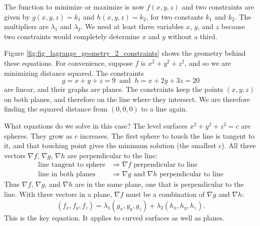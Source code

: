The function to minimize or maximize is now $f(x,y,z)$ and two constraints are given by $g(x,y,z) = k_1$ and $h(x,y,z) = k_2$, for two constants $k_1$ and $k_2$.  The multipliers are $\lambda_1$ and $\lambda_2$.  We need at least three variables $x$, $y$, and $z$ because two constraints would completely determine $x$ and $y$ without a third.

Figure \ref{fig:fig_lagrange_geometry_2_constraints} shows the geometry behind these equations.  For convenience, suppose $f$ is $x^2 + y^2 + z^2$, and so we are minimizing distance squared.  The constraints $$g = x + y + z = 9 \: \text{ and } \: h = x + 2y + 3z = 20$$ are linear, and their graphs are planes.  The constraints keep the points $(x,y,z)$ on both planes, and therefore on the line where they intersect.  We are therefore finding the squared distance from $(0,0,0)$ to a line again.  


What equations do we solve in this case?  The level surfaces $x^2 + y^2 + z^2 = c$ are spheres.  They grow as $c$ increases.  The first sphere to touch the line is tangent to it, and that touching point gives the minimum solution (the smallest $c$). All three vectors $\nabla f$, $\nabla g$, $\nabla h$ are perpendicular to the line:
\begin{align*}
\text{line tangent to sphere} & \Rightarrow \nabla f \text{ perpendicular to line} \\
\text{line in both planes} & \Rightarrow \nabla g \text{ and } \nabla h \text{ perpendicular to line}
\end{align*}
Thus $\nabla f$, $\nabla g$, and $\nabla h$ are in the same plane, one that is perpendicular to the line.  With three vectors in a plane, $\nabla f$ must be a combination of $\nabla g$ and $\nabla h$:
$$(f_x,f_y,f_z) = \lambda_1 (g_x,g_y,g_z) + \lambda_2 (h_x,h_y,h_z).$$
This is the key equation.  It applies to curved surfaces as well as planes.

